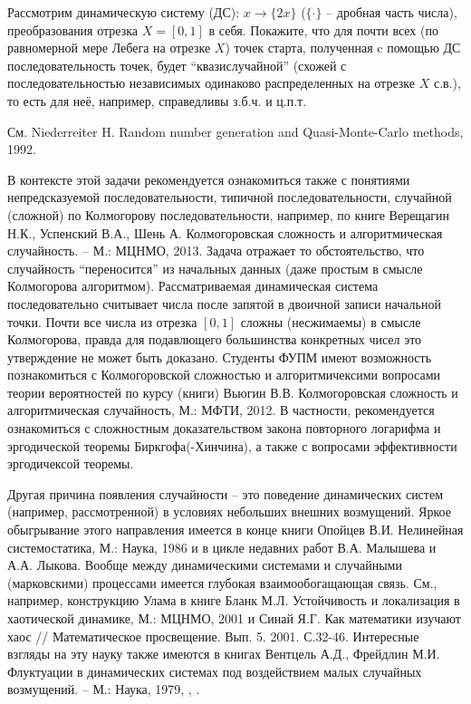 \begin{problem}
Рассмотрим динамическую систему (ДС): $x\to\{2x\}$ ($\{\cdot \}$ -- дробная часть числа), преобразования отрезка $X = [0,1]$ в себя. Покажите, что для почти всех (по равномерной мере Лебега на отрезке $X$) точек старта, полученная c помощью ДС последовательность точек, будет ``квазислучайной'' (схожей с последовательностью независимых одинаково распределенных на отрезке $X$ с.в.), то есть для неё, например, справедливы з.б.ч. и ц.п.т.
\begin{ordre}
См. Niederreiter H. Random number generation and Quasi-Monte-Carlo methods, 1992.
\end{ordre}
\begin{remark}
В контексте этой задачи рекомендуется ознакомиться также с понятиями непредсказуемой последовательности, типичной последовательности, случайной (сложной) по Колмогорову последовательности, например, по книге Верещагин Н.К., Успенский В.А., Шень А. Колмогоровская сложность и алгоритмическая случайность. -- М.: МЦНМО, 2013. Задача отражает то обстоятельство, что случайность ``переносится'' из начальных данных (даже простым в смысле Колмогорова алгоритмом). Рассматриваемая динамическая система последовательно считывает числа после запятой в двоичной записи начальной точки. Почти все числа из отрезка $[0,1]$ сложны (несжимаемы) в смысле Колмогорова, правда для подавлющего большинства конкретных чисел это утверждение не может быть доказано. Студенты ФУПМ имеют возможность познакомиться с Колмогоровской сложностью и алгоритмичексими вопросами теории вероятностей по курсу (книги) Вьюгин В.В. Колмогоровская сложность и алгоритмическая случайность, М.: МФТИ, 2012. В частности, рекомендуется ознакомиться с сложностным доказательством закона повторного логарифма и эргодической теоремы Биркгофа(-Хинчина), а также с  вопросами эффективности эргодичексой теоремы. 

Другая причина появления случайности -- это поведение динамических систем (например, рассмотренной) в условиях небольших внешних возмущений. Яркое обыгрывание этого направления имеется в конце книги Опойцев В.И. Нелинейная системостатика, М.: Наука, 1986 и в цикле недавних работ В.А. Малышева и А.А. Лыкова. Вообще между динамическими системами и случайными (марковскими) процессами имеется глубокая взаимообогащающая связь. См., например, конструкцию Улама в книге Бланк М.Л. Устойчивость и локализация в хаотической динамике, М.: МЦНМО, 2001 и Синай Я.Г. Как математики изучают хаос // Математическое просвещение. Вып. 5. 2001. С.32-46. Интересные взгляды на эту науку также имеются в книгах Вентцель А.Д., Фрейдлин М.И. Флуктуации в динамических системах под воздействием малых случайных возмущений. -- М.: Наука, 1979, \cite{333}, \cite{101}.


\end{remark}
\end{problem}
